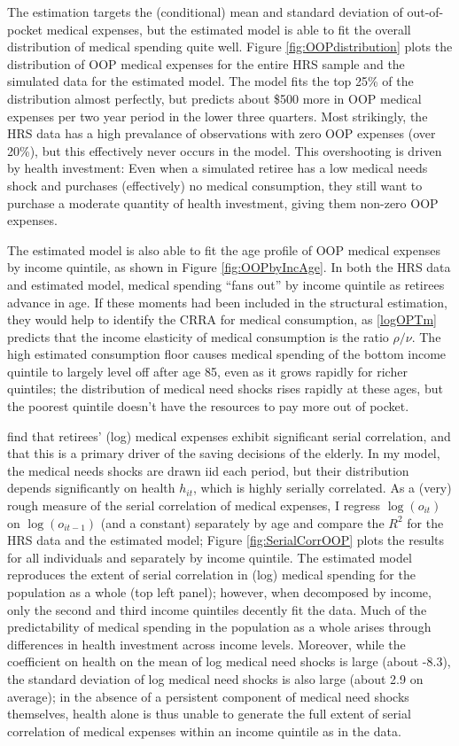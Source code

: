 \documentclass[12pt,pdftex,letterpaper]{article}
\newcommand{\Health}{h}
\newcommand{\OOP}{o}
\newcommand{\CRRAcon}{\rho}
\newcommand{\CRRAcare}{\nu}
\begin{document}
The estimation targets the (conditional) mean and standard deviation of out-of-pocket medical expenses, but the estimated model is able to fit the overall distribution of medical spending quite well.  Figure \ref{fig:OOPdistribution} plots the distribution of OOP medical expenses for the entire HRS sample and the simulated data for the estimated model.  The model fits the top 25\% of the distribution almost perfectly, but predicts about \$500 more in OOP medical expenses per two year period in the lower three quarters.  Most strikingly, the HRS data has a high prevalance of observations with zero OOP expenses (over 20\%), but this effectively never occurs in the model.  This overshooting is driven by health investment: Even when a simulated retiree has a low medical needs shock and purchases (effectively) no medical consumption, they still want to purchase a moderate quantity of health investment, giving them non-zero OOP expenses.

The estimated model is also able to fit the age profile of OOP medical expenses by income quintile, as shown in Figure \ref{fig:OOPbyIncAge}.  In both the HRS data and estimated model, medical spending ``fans out'' by income quintile as retirees advance in age.  If these moments had been included in the structural estimation, they would help to identify the CRRA for medical consumption, as \eqref{logOPTm} predicts that the income elasticity of medical consumption is the ratio $\CRRAcon/\CRRAcare$.  The high estimated consumption floor causes medical spending of the bottom income quintile to largely level off after age 85, even as it grows rapidly for richer quintiles; the distribution of medical need shocks rises rapidly at these ages, but the poorest quintile doesn't have the resources to pay more out of pocket.

\cite{dinardi10} find that retirees' (log) medical expenses exhibit significant serial correlation, and that this is a primary driver of the saving decisions of the elderly.  In my model, the medical needs shocks are drawn iid each period, but their distribution depends significantly on health $\Health_{it}$, which is highly serially correlated.  As a (very) rough measure of the serial correlation of medical expenses, I regress $\log(\OOP_{it})$ on $\log(\OOP_{it-1})$ (and a constant) separately by age and compare the $R^2$ for the HRS data and the estimated model; Figure \ref{fig:SerialCorrOOP} plots the results for all individuals and separately by income quintile.  The estimated model reproduces the extent of serial correlation in (log) medical spending for the population as a whole (top left panel); however, when decomposed by income, only the second and third income quintiles decently fit the data.  Much of the predictability of medical spending in the population as a whole arises through differences in health investment across income levels.  Moreover, while the coefficient on health on the mean of log medical need shocks is large (about -8.3), the standard deviation of log medical need shocks is also large (about 2.9 on average); in the absence of a persistent component of medical need shocks themselves, health alone is thus unable to generate the full extent of serial correlation of medical expenses within an income quintile as in the data.
\end{document}
